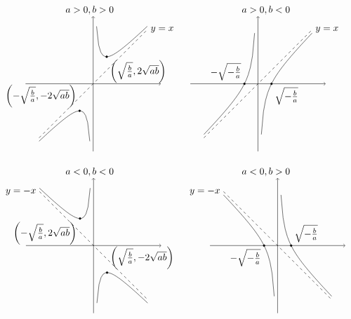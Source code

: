 \documentclass[8pt]{article}
\begin{document}
					$$
					\begin{array}{cc}
					a>0, b>0&a>0, b<0\\
					\begin{tikzpicture}[scale=0.5]
			    		\draw[black, ->] (-5,  0)--( 5,  0);
			    		\draw[black, ->] ( 0, -5)--( 0,  5);
			    		\draw[black, domain=-4:-0.25] plot(\x,\x + 1 / \x);
						\draw[black, domain=0.25:4] plot(\x,\x + 1 / \x);
						\draw[black, dashed, domain=-4:4] plot(\x, \x) node[anchor = west] at (4, 4) {$y=x$};
						\filldraw[black] (-1, -2) circle (2pt) node[anchor=south east] {$\left(-\sqrt{\frac{b}{a}}, -2\sqrt{ab}\right)$};
						\filldraw[black] ( 1,  2) circle (2pt) node[anchor=north west] {$\left(\sqrt{\frac{b}{a}}, 2\sqrt{ab}\right)$};
			    	\end{tikzpicture}
			    	&
			    	\begin{tikzpicture}[scale=0.5]
			    		\draw[black, ->] (-5,  0)--( 5,  0);
			    		\draw[black, ->] ( 0, -5)--( 0,  5);
			    		\draw[black, domain=-4:-0.25] plot(\x,\x - 1 / \x);
						\draw[black, domain=0.25:4] plot(\x,\x - 1 / \x);
						\draw[black, dashed, domain=-4:4] plot(\x, \x) node[anchor = west] at (4, 4) {$y=x$};
						\filldraw[black] (-1, 0) circle (2pt) node[anchor=south east] {$-\sqrt{-\frac{b}{a}}$};
						\filldraw[black] ( 1, 0) circle (2pt) node[anchor=north west] {$\sqrt{-\frac{b}{a}}$};
			    	\end{tikzpicture}
			    	\\\\
			    	a<0, b<0&a<0, b>0\\
			    	\begin{tikzpicture}[scale=0.5]
			    		\draw[black, ->] (-5,  0)--( 5,  0);
			    		\draw[black, ->] ( 0, -5)--( 0,  5);
			    		\draw[black, domain=-4:-0.25] plot(\x,-\x - 1 / \x);
						\draw[black, domain=0.25:4] plot(\x,-\x - 1 / \x);
						\draw[black, dashed, domain=-4:4] plot(\x, -\x) node[anchor = east] at (-4, 4) {$y=-x$};
						\filldraw[black] (-1,  2) circle (2pt) node[anchor=north east] {$\left(-\sqrt{\frac{b}{a}}, 2\sqrt{ab}\right)$};
						\filldraw[black] ( 1, -2) circle (2pt) node[anchor=south west] {$\left(\sqrt{\frac{b}{a}}, -2\sqrt{ab}\right)$};
			    	\end{tikzpicture}
			    	&
			    	\begin{tikzpicture}[scale=0.5]
			    		\draw[black, ->] (-5,  0)--( 5,  0);
			    		\draw[black, ->] ( 0, -5)--( 0,  5);
			    		\draw[black, domain=-4:-0.25] plot(\x,-\x + 1 / \x);
						\draw[black, domain=0.25:4] plot(\x,-\x + 1 / \x);
						\draw[black, dashed, domain=-4:4] plot(\x, -\x) node[anchor = east] at (-4, 4) {$y=-x$};
						\filldraw[black] (-1, 0) circle (2pt) node[anchor=north east] {$-\sqrt{-\frac{b}{a}}$};
						\filldraw[black] ( 1, 0) circle (2pt) node[anchor=south west] {$\sqrt{-\frac{b}{a}}$};
			    	\end{tikzpicture}
					\end{array}
					$$
				~\\
\end{document}
